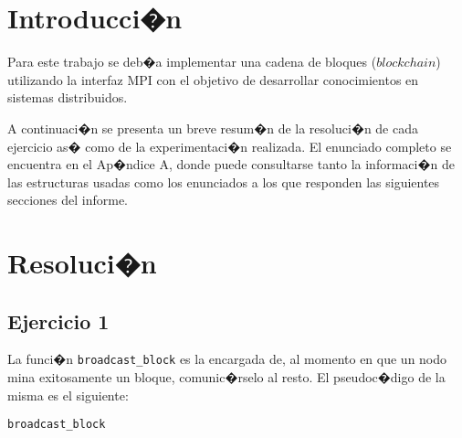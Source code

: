 \documentclass[10pt, a4paper, hidelinks]{article}
\begin{document}

\maketitle

\tableofcontents
{}

\pagebreak
{}
\cfoot{\thepage /\pageref{LastPage}}

\section{Introducci�n}
Para este trabajo se deb�a implementar una cadena de bloques ($blockchain$) utilizando la interfaz MPI con el objetivo de desarrollar conocimientos en sistemas distribuidos.

A continuaci�n se presenta un breve resum�n de la resoluci�n de cada ejercicio as� como de la experimentaci�n realizada. El enunciado completo se encuentra en el Ap�ndice A, donde puede consultarse tanto la informaci�n de las estructuras usadas como los enunciados a los que responden las siguientes secciones del informe.

\section{Resoluci�n}
\subsection{Ejercicio 1}
La funci�n \texttt{broadcast\_block} es la encargada de, al momento en que un nodo mina exitosamente un bloque, comunic�rselo al resto. El pseudoc�digo de la misma es el siguiente:

\begin{algorithm}[H]
\SetAlgoLined
{}
\caption{\texttt{broadcast\_block}}
\end{algorithm}
\end{document}
